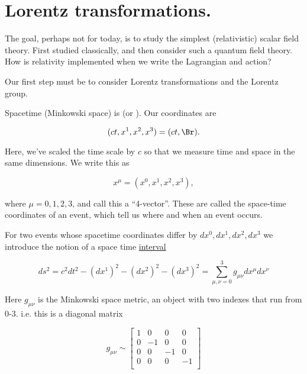 %
%
\section{Lorentz transformations.}

The goal, perhaps not for today, is to study the simplest (relativistic) scalar field theory.  First studied classically, and then consider such a quantum field theory.
How is relativity implemented when we write the Lagrangian and action?

Our first step must be to consider Lorentz transformations and the Lorentz group.

Spacetime (Minkowski space) is  (or ).  Our coordinates are

\begin{dmath}\label{eqn:qftLecture2:340}
(c t, x^1, x^2, x^3) = (c t, \Br).
\end{dmath}

Here, we've scaled the time scale by \( c \) so that we measure time and space in the same dimensions.  We write this as

\begin{dmath}\label{eqn:qftLecture2:360}
x^\mu = (x^0, x^1, x^2, x^3),
\end{dmath}

where \( \mu = 0, 1, 2, 3 \), and call this a ``4-vector''.  These are called the space-time coordinates of an event, which tell us where and when an event occurs.

For two events whose spacetime coordinates differ by \( dx^0, dx^1, dx^2, dx^3 \) we introduce the notion of a space time \underline{interval}

\begin{dmath}\label{eqn:qftLecture2:380}
ds^2 = c^2 dt^2
- (dx^1)^2
- (dx^2)^2
- (dx^3)^2
=
\sum_{\mu, \nu = 0}^3 g_{\mu\nu} dx^\mu dx^\nu
\end{dmath}

Here \( g_{\mu\nu} \) is the Minkowski space metric, an object with two indexes that run from 0-3.  i.e. this is a diagonal matrix

\begin{dmath}\label{eqn:qftLecture2:400}
g_{\mu\nu} \sim
\begin{bmatrix}
1 & 0 & 0 & 0 \\
0 & -1 & 0 & 0 \\
0 & 0 & -1 & 0 \\
0 & 0 & 0 & -1 \\
\end{bmatrix}
\end{dmath}

